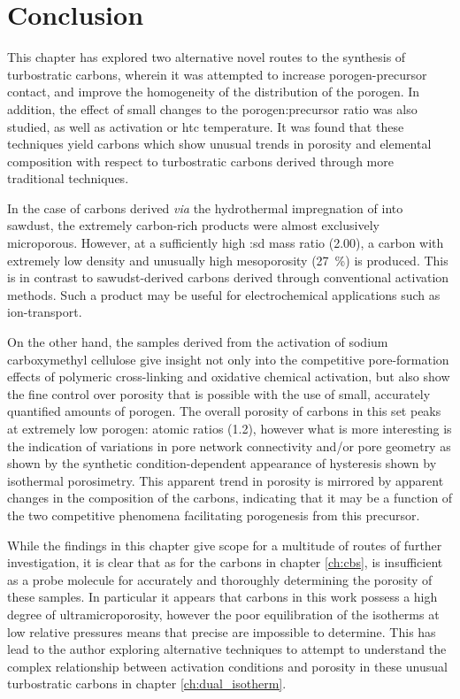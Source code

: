 \section{Conclusion}
\label{s:impregnation_conclusion}
This chapter has explored two alternative novel routes to the synthesis of \glspl{turbostratic carbon}, wherein it was attempted to increase \gls{porogen}-precursor contact, and improve the homogeneity of the distribution of the \gls{porogen}. In addition, the effect of small changes to the \gls{porogen}:precursor ratio was also studied, as well as \gls{activation} or \gls{htc} temperature. It was found that these techniques yield carbons which show unusual trends in porosity and elemental composition with respect to \glspl{turbostratic carbon} derived through more traditional techniques. 

In the case of carbons derived \textit{via} the hydrothermal impregnation of  into sawdust, the extremely carbon-rich products were almost exclusively microporous. However, at a sufficiently high :\acrshort{sd} mass ratio (2.00), a carbon with extremely low density and unusually high mesoporosity (\qty{27}{\percent}) is produced. This is in contrast to sawudst-derived carbons derived through conventional activation methods. Such a product may be useful for electrochemical applications such as ion-transport.

On the other hand, the samples derived from the activation of sodium carboxymethyl cellulose give insight not only into the competitive pore-formation effects of polymeric cross-linking and oxidative chemical activation, but also show the fine control over porosity that is possible with the use of small, accurately quantified amounts of \gls{porogen}. The overall porosity of carbons in this set peaks at extremely low \gls{porogen}: atomic ratios (1.2), however what is more interesting is the indication of variations in pore network connectivity and/or pore geometry as shown by the synthetic condition-dependent appearance of hysteresis shown by  isothermal porosimetry. This apparent trend in porosity is mirrored by apparent changes in the composition of the carbons, indicating that it may be a function of the two competitive phenomena facilitating porogenesis from this precursor.

While the findings in this chapter give scope for a multitude of routes of further investigation, it is clear that as for the carbons in chapter \ref{ch:cbs},  is insufficient as a probe molecule for accurately and thoroughly determining the porosity of these samples. In particular it appears that carbons in this work possess a high degree of ultramicroporosity, however the poor equilibration of the isotherms at low relative pressures means that precise  are impossible to determine. This has lead to the author exploring alternative techniques to attempt to understand the complex relationship between activation conditions and porosity in these unusual \glspl{turbostratic carbon} in chapter \ref{ch:dual_isotherm}.


